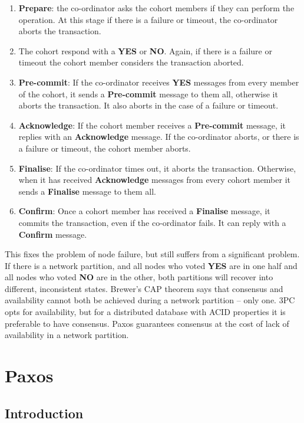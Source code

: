 \documentclass[12pt,twoside,notitlepage]{report}
\newcommand{\msg}[1] {{\bf #1}}         %
\begin{document}
\begin{enumerate}
\item \msg{Prepare}: the co-ordinator asks the cohort members if they can perform the operation. At
	this stage if there is a failure or timeout, the co-ordinator aborts the transaction.
\item The cohort respond with a \msg{YES} or \msg{NO}. Again, if there is a failure or timeout the cohort
	member considers the transaction aborted.
\item \msg{Pre-commit}: If the co-ordinator receives \msg{YES} messages from every member of the
	cohort, it sends a \msg{Pre-commit} message to them all, otherwise it aborts the
	transaction. It also aborts in the case of a failure or timeout.
\item \msg{Acknowledge}: If the cohort member receives a \msg{Pre-commit} message, it replies with
	an \msg{Acknowledge} message. If the co-ordinator aborts, or there is a failure or
	timeout, the cohort member aborts.
\item \msg{Finalise}: If the co-ordinator times out, it aborts the transaction. Otherwise, when it
	has received \msg{Acknowledge} messages from every cohort member it sends a \msg{Finalise}
	message to them all.
\item \msg{Confirm}: Once a cohort member has received a \msg{Finalise} message, it commits the
	transaction, even if the co-ordinator fails. It can reply with a \msg{Confirm} message.
\end{enumerate}

This fixes the problem of node failure, but still suffers from a significant problem. If there is
a network partition, and all nodes who voted \msg{YES} are in one half and all nodes who voted
\msg{NO} are in the other, both partitions will recover into different, inconsistent states.
Brewer's CAP theorem \cite{gilbert2002} says that consensus and availability cannot both be
achieved during a network partition --  only one. 3PC opts for availability, but for a distributed
database with ACID properties it is preferable to have consensus. Paxos guarantees consensus at
the cost of lack of availability in a network partition.

\section{Paxos}

\subsection{Introduction}
\end{document}
